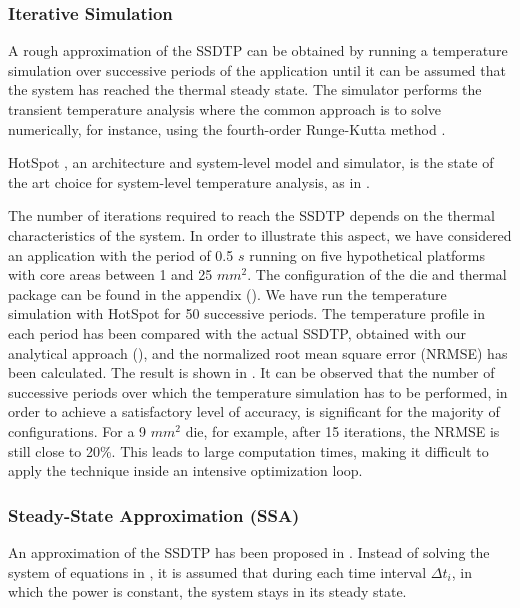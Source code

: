 \subsubsection{Iterative Simulation}

A rough approximation of the SSDTP can be obtained by running a temperature
simulation over successive periods of the application until it can be assumed
that the system has reached the thermal steady state. The simulator performs the
transient temperature analysis where the common approach is to solve
 numerically, for instance, using the
fourth-order Runge-Kutta method \cite{press2007}.

HotSpot \cite{skadron2003}, an architecture and system-level model and
simulator, is the state of the art choice for system-level temperature analysis,
as in \cite{srinivasan2004, liao2005, coskun2006, liu2007, huang2009, xiang2010,
thiele2011}.

The number of iterations required to reach the SSDTP depends on the thermal
characteristics of the system. In order to illustrate this aspect, we have
considered an application with the period of 0.5 $s$ running on five
hypothetical platforms with core areas between 1 and 25 $mm^2$. The
configuration of the die and thermal package can be found in the appendix
(). We have run the temperature simulation with HotSpot
\cite{skadron2003} for 50 successive periods. The temperature profile in each
period has been compared with the actual SSDTP, obtained with our analytical
approach (), and the normalized root mean square error
(NRMSE) has been calculated. The result is shown in . It can
be observed that the number of successive periods over which the temperature
simulation has to be performed, in order to achieve a satisfactory level of
accuracy, is significant for the majority of configurations. For a 9 $mm^2$ die,
for example, after 15 iterations, the NRMSE is still close to 20\%. This leads
to large computation times, making it difficult to apply the technique inside an
intensive optimization loop.

\subsubsection{Steady-State Approximation (SSA)}

An approximation of the SSDTP has been proposed in \cite{huang2009}. Instead of
solving the system of equations in , it is
assumed that during each time interval $\Delta t_i$, in which the power is
constant, the system stays in its steady state.


